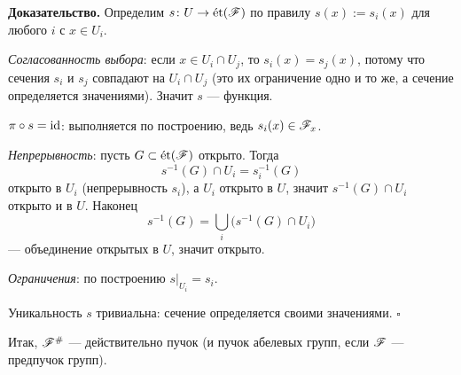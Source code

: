 \textbf{Доказательство.} Определим $s\colon U\to\et(\Shv{F})$ по правилу
$s(x):=s_i(x)$ для любого $i$ с $x\in U_i$.
\begin{conditions}
\item \emph{Согласованность выбора}: если $x\in U_i\cap U_j$, то
 $s_i(x)=s_j(x)$, потому что сечения $s_i$ и $s_j$ совпадают на
 $U_i\cap U_j$ (это их ограничение одно и то же, а сечение
 определяется значениями). Значит $s$ --- функция.
\item \emph{$\pi\circ s=\id$}: выполняется по построению, ведь
 $s_i(x)\in\Shv{F}_x$.
\item \emph{Непрерывность}: пусть $G\subset\et(\Shv{F})$ открыто. Тогда
 \[
   s^{-1}(G)\cap U_i=s_i^{-1}(G)
 \]
 открыто в $U_i$ (непрерывность $s_i$), а $U_i$ открыто в $U$,
 значит $s^{-1}(G)\cap U_i$ открыто и в $U$. Наконец
 \[
   s^{-1}(G)=\bigcup_i\bigl(s^{-1}(G)\cap U_i\bigr)
 \]
 --- объединение открытых в $U$, значит открыто.
\item \emph{Ограничения}: по построению $s|_{U_i}=s_i$.
\end{conditions}
Уникальность $s$ тривиальна: сечение определяется своими значениями.
\hfill$\square$

Итак, $\Shv{F}^{\#}$ --- действительно пучок (и пучок абелевых групп,
если $\Shv{F}$ --- предпучок групп).


